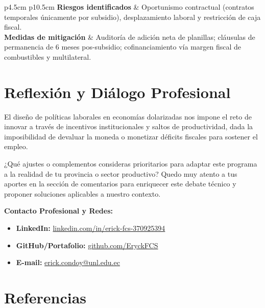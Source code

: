 \documentclass[10pt,]{article}
\providecommand{\tightlist}{%
  \setlength{\itemsep}{0pt}\setlength{\parskip}{0pt}}
\begin{document}
\begin{singlespace}
\begin{small}
\begin{longtable}{p{4.5cm} p{10.5cm}}
\textbf{Riesgos identificados} & Oportunismo contractual (contratos temporales únicamente por subsidio), desplazamiento laboral y restricción de caja fiscal. \\ \addlinespace
\textbf{Medidas de mitigación} & Auditoría de adición neta de planillas; cláusulas de permanencia de 6 meses pos-subsidio; cofinanciamiento vía margen fiscal de combustibles y multilateral. \\ \bottomrule
{}
\end{longtable}
\end{small}
\end{singlespace}

\section{Reflexión y Diálogo
Profesional}\label{reflexiuxf3n-y-diuxe1logo-profesional}

El diseño de políticas laborales en economías dolarizadas nos impone el
reto de innovar a través de incentivos institucionales y saltos de
productividad, dada la imposibilidad de devaluar la moneda o monetizar
déficits fiscales para sostener el empleo.

¿Qué ajustes o complementos consideras prioritarios para adaptar este
programa a la realidad de tu provincia o sector productivo? Quedo muy
atento a tus aportes en la sección de comentarios para enriquecer este
debate técnico y proponer soluciones aplicables a nuestro contexto.

\noindent \textbf{Contacto Profesional y Redes:}

\begin{itemize}
\tightlist
\item
  \textbf{LinkedIn:}
  \href{https://www.linkedin.com/in/erick-fcs-370925394/}{linkedin.com/in/erick-fcs-370925394}
\item
  \textbf{GitHub/Portafolio:}
  \href{https://github.com/EryckFCS}{github.com/EryckFCS}
\item
  \textbf{E-mail:}
  \href{mailto:erick.condoy@unl.edu.ec}{erick.condoy@unl.edu.ec}
\end{itemize}

\section{Referencias}\label{referencias}
\end{document}
